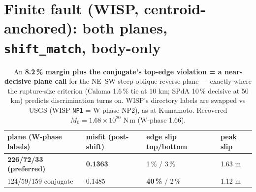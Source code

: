 \documentclass[11pt]{article}
\begin{document}
\section{Finite fault (WISP, centroid-anchored): both planes, \texttt{shift\_match}, body-only}
\begin{table}[H]\centering\small
\begin{tabular}{llll}
\toprule
plane (W-phase labels) & misfit (post-shift) & edge slip top/bottom & peak slip \\
\midrule
\textbf{226/72/33 (preferred)} & \textbf{0.1363} & 1\,\% / 3\,\% & 1.63 m \\
124/59/159 conjugate & 0.1485 & \textbf{40\,\%} / 2\,\% & 1.12 m \\
\bottomrule
\end{tabular}
\caption{An \textbf{8.2\,\% margin plus the conjugate's top-edge violation = a near-decisive
plane call} for the NE--SW steep oblique-reverse plane --- exactly where the rupture-size
criterion (Calama 1.6\,\% tie at 10 km; SPdA 10\,\% decisive at 50 km) predicts discrimination
turns on. WISP's directory labels are swapped vs USGS (WISP \texttt{NP1} = W-phase NP2), as at
Kumamoto. Recovered $M_0=1.68\times10^{20}$ N\,m (W-phase 1.66).}
\end{table}
\end{document}
